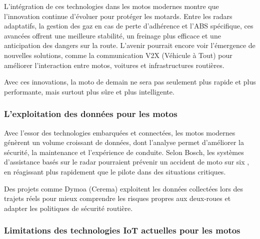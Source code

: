 L’intégration de ces technologies dans les motos modernes montre que l’innovation continue d’évoluer pour protéger les motards. Entre les radars adaptatifs, la gestion des gaz en cas de perte d’adhérence et l’ABS spécifique, ces avancées offrent une meilleure stabilité, un freinage plus efficace et une anticipation des dangers sur la route. L’avenir pourrait encore voir l’émergence de nouvelles solutions, comme la communication V2X (Véhicule à Tout) pour améliorer l’interaction entre motos, voitures et infrastructures routières.

Avec ces innovations, la moto de demain ne sera pas seulement plus rapide et plus performante, mais surtout plus sûre et plus intelligente. 

\subsubsection{L'exploitation des données pour les motos}
Avec l’essor des technologies embarquées et connectées, les motos modernes génèrent un volume croissant de données, dont l’analyse permet d’améliorer la sécurité, la maintenance et l’expérience de conduite.
Selon Bosch, les systèmes d’assistance basés sur le radar pourraient prévenir un accident de moto sur six \cite{aras_bosh_site_off}, en réagissant plus rapidement que le pilote dans des situations critiques. 


Des projets comme Dymoa (Cerema) exploitent les données collectées lors des trajets réels pour mieux comprendre les risques propres aux deux-roues et adapter les politiques de sécurité routière.




\subsubsection{Limitations des technologies IoT actuelles pour les motos}

